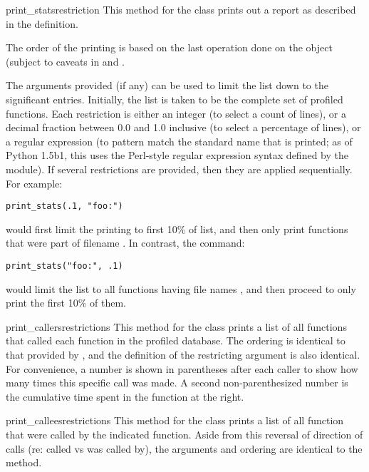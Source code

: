 \begin{funcdesc}{print_stats}{restriction}
This method for the  class prints out a report as described
in the  definition.

The order of the printing is based on the last 
operation done on the object (subject to caveats in  and
.

The arguments provided (if any) can be used to limit the list down to
the significant entries.  Initially, the list is taken to be the
complete set of profiled functions.  Each restriction is either an
integer (to select a count of lines), or a decimal fraction between
0.0 and 1.0 inclusive (to select a percentage of lines), or a regular
expression (to pattern match the standard name that is printed; as of
Python 1.5b1, this uses the Perl-style regular expression syntax
defined by the  module).  If several restrictions are
provided, then they are applied sequentially.  For example:

\bcode\begin{verbatim}
print_stats(.1, "foo:")
\end{verbatim}\ecode
%
would first limit the printing to first 10\% of list, and then only
print functions that were part of filename .  In
contrast, the command:

\bcode\begin{verbatim}
print_stats("foo:", .1)
\end{verbatim}\ecode
%
would limit the list to all functions having file names ,
and then proceed to only print the first 10\% of them.
\end{funcdesc}


\begin{funcdesc}{print_callers}{restrictions}
This method for the  class prints a list of all functions
that called each function in the profiled database.  The ordering is
identical to that provided by , and the definition
of the restricting argument is also identical.  For convenience, a
number is shown in parentheses after each caller to show how many
times this specific call was made.  A second non-parenthesized number
is the cumulative time spent in the function at the right.
\end{funcdesc}

\begin{funcdesc}{print_callees}{restrictions}
This method for the  class prints a list of all function
that were called by the indicated function.  Aside from this reversal
of direction of calls (re: called vs was called by), the arguments and
ordering are identical to the  method.
\end{funcdesc}

